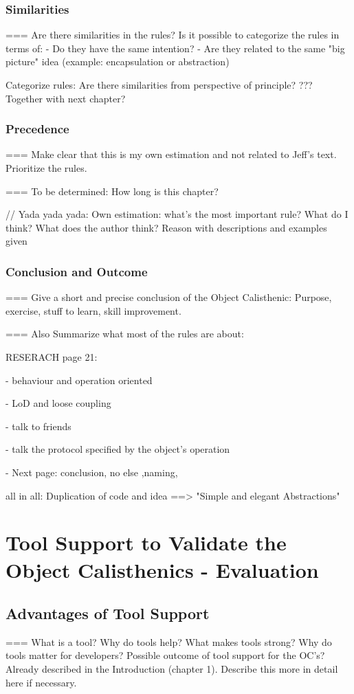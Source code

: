 \subsection{Similarities}
=== Are there similarities in the rules? Is it possible to categorize the rules in terms of: 
 - Do they have the same intention?
 - Are they related to the same "big picture" idea (example: encapsulation or abstraction) 

Categorize rules: Are there similarities from perspective of principle? ??? Together with next chapter?

\subsection{Precedence}
=== Make clear that this is my own estimation and not related to Jeff's text. Prioritize the rules. 

=== To be determined: How long is this chapter?

\begin{itshape}
// Yada yada yada: 
Own estimation: what's the most important rule? 
What do I think?
What does the author think? 
Reason with descriptions and examples given
\end{itshape}

\subsection{Conclusion and Outcome}
=== Give a short and precise conclusion of the Object Calisthenic: Purpose, exercise, stuff to learn, skill improvement. 

=== Also Summarize what most of the rules are about: 

RESERACH page 21: 

- behaviour and operation oriented

- LoD and loose coupling

- talk to friends

- talk the protocol specified by the object's operation

- Next page: conclusion, no else ,naming, 

all in all: Duplication of code and idea
==> "Simple and elegant Abstractions"


\chapter{Tool Support to Validate the Object Calisthenics - Evaluation}
\label{Evaluation}
\section{Advantages of Tool Support}
=== What is a tool? Why do tools help? What makes tools strong? Why do tools matter for developers?
Possible outcome of tool support for the OC's? Already described in the Introduction (chapter 1). Describe this more in detail here if necessary. 
